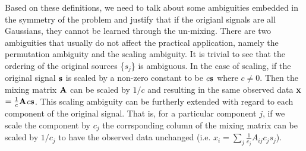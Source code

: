 \documentclass[aps,prl,preprint,superscriptaddress]{revtex4-2}
\begin{document}
Based on these definitions, we need to talk about some ambiguities embedded in the symmetry of the problem and justify that if the origianl signals are all Gaussians, they cannot be learned through the un-mixing. There are two ambiguities that usually do not affect the practical application, namely the permutation ambiguity and the scaling ambiguity. It is trivial to see that the ordering of the original sources \{$s_{j}$\} is ambiguous. In the case of scaling, if the original signal $\bf{s}$ is scaled by a non-zero constant to be $c\bf{s}$ where $c \neq 0$. Then the mixing matrix $\bf{A}$ can be scaled by $1/c$ and resulting in the same observed data $\bf{x}$$ = \frac{1}{c}\bf{A}$$c\bf{s}$. This scaling ambiguity can be furtherly extended with regard to each component of the original signal. That is, for a particular component $j$, if we scale the component by $c_{j}$ the corrsponding column of the mixing matrix can be scaled by $1/c_{j}$ to have the observed data unchanged (i.e. $x_{i} = \sum_{j}\frac{1}{c_{j}}A_{ij}c_{j}s_{j}$).  
\end{document}
